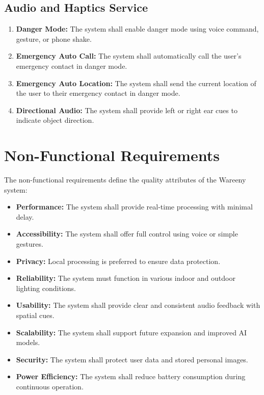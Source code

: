 \documentclass[a4paper]{report}
\begin{document}
\subsection{Audio and Haptics Service}

\begin{enumerate}[label=FR-AH-\arabic*:]
    \item \textbf{Danger Mode:} The system shall enable danger mode using voice command, gesture, or phone shake.
    \item \textbf{Emergency Auto Call:} The system shall automatically call the user's emergency contact in danger mode.
    \item \textbf{Emergency Auto Location:} The system shall send the current location of the user to their emergency contact in danger mode.
    \item \textbf{Directional Audio:} The system shall provide left or right ear cues to indicate object direction.
\end{enumerate}

\section{Non-Functional Requirements}
\label{sec:non-functional-req}

The non-functional requirements define the quality attributes of the Wareeny system:

\begin{itemize}
    \item \textbf{Performance:} The system shall provide real-time processing with minimal delay.
    \item \textbf{Accessibility:} The system shall offer full control using voice or simple gestures.
    \item \textbf{Privacy:} Local processing is preferred to ensure data protection.
    \item \textbf{Reliability:} The system must function in various indoor and outdoor lighting conditions.
    \item \textbf{Usability:} The system shall provide clear and consistent audio feedback with spatial cues.
    \item \textbf{Scalability:} The system shall support future expansion and improved AI models.
    \item \textbf{Security:} The system shall protect user data and stored personal images.
    \item \textbf{Power Efficiency:} The system shall reduce battery consumption during continuous operation.
\end{itemize}
\end{document}
